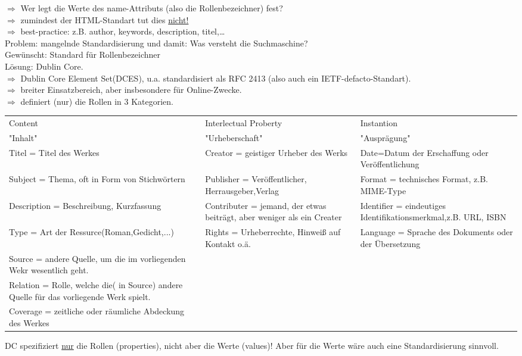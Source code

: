 $\Rightarrow$ Wer legt die Werte des name-Attributs (also die Rollenbezeichner) fest?\\
$\Rightarrow$ zumindest der HTML-Standart tut dies \underline{nicht!}\\
$\Rightarrow$ best-practice: z.B. author, keywords, description, titel,\dots\\
Problem: mangelnde Standardisierung und damit: Was versteht die Suchmaschine?\\
Gewünscht: Standard für Rollenbezeichner\\
Lösung: Dublin Core.\\
$\Rightarrow$ Dublin Core Element Set(DCES), u.a. standardisiert als RFC 2413 (also auch ein IETF-defacto-Standart).\\
$\Rightarrow$ breiter Einsatzbereich, aber insbesondere für Online-Zwecke.\\
$\Rightarrow$ definiert (nur) die Rollen in 3 Kategorien.\\
\newline
\begin{tabularx}{\textwidth}{|X|X|X|}
 \hline 
 Content & Interlectual Proberty & Instantion \\ 
 "Inhalt" & "Urheberschaft" & "Ausprägung" \\ 
 \hline 
 \hline
 Titel = Titel des Werkes & Creator = geistiger Urheber des Werks & Date=Datum der Erschaffung oder Veröffentlichung \\ 
 \hline 
 Subject = Thema, oft in Form von Stichwörtern & Publisher = Veröffentlicher, Herrausgeber,Verlag & Format = technisches Format, z.B. MIME-Type \\ 
 \hline 
 Description = Beschreibung, Kurzfassung & Contributer = jemand, der etwas beiträgt, aber weniger als ein Creater & Identifier = eindeutiges Identifikationsmerkmal,z.B. URL, ISBN \\ 
 \hline 
 Type = Art der Ressurce(Roman,Gedicht,...) & Rights = Urheberrechte, Hinweiß auf Kontakt o.ä. & Language = Sprache des Dokuments oder der Übersetzung \\ 
 \hline 
 Source = andere Quelle, um die im vorliegenden Wekr wesentlich geht. &  &  \\ 
 \hline 
 Relation = Rolle, welche die( in Source) andere Quelle für das vorliegende Werk spielt. &  &  \\ 
 \hline 
 Coverage = zeitliche oder räumliche Abdeckung des Werkes &  &  \\ 
 \hline 
\end{tabularx}  
DC spezifiziert \underline{nur} die Rollen (properties), nicht aber die Werte (values)! Aber für die Werte wäre auch eine Standardisierung sinnvoll.\\
